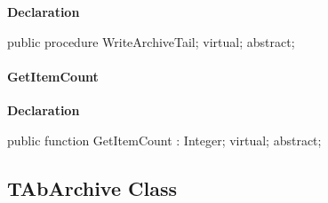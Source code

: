 \documentclass{report}
\newif\ifpdf
\begin{document}
\label{AbArcTyp.TAbArchiveStreamHelper-WriteArchiveTail}
\begin{list}{}{
\setlength{\itemindent}{0cm}
\setlength{\listparindent}{0cm}
\setlength{\leftmargin}{\evensidemargin}
\addtolength{\leftmargin}{\tmplength}
\settowidth{\labelsep}{X}
\addtolength{\leftmargin}{\labelsep}
\setlength{\labelwidth}{\tmplength}
}
\item[\textbf{Declaration}\hfill]
\ifpdf
\begin{flushleft}
\fi
\begin{ttfamily}
public procedure WriteArchiveTail; virtual; abstract;\end{ttfamily}

\ifpdf
\end{flushleft}
\fi

\end{list}
\paragraph*{GetItemCount}\hspace*{\fill}

\label{AbArcTyp.TAbArchiveStreamHelper-GetItemCount}
\begin{list}{}{
\setlength{\itemindent}{0cm}
\setlength{\listparindent}{0cm}
\setlength{\leftmargin}{\evensidemargin}
\addtolength{\leftmargin}{\tmplength}
\settowidth{\labelsep}{X}
\addtolength{\leftmargin}{\labelsep}
\setlength{\labelwidth}{\tmplength}
}
\item[\textbf{Declaration}\hfill]
\ifpdf
\begin{flushleft}
\fi
\begin{ttfamily}
public function GetItemCount : Integer; virtual; abstract;\end{ttfamily}

\ifpdf
\end{flushleft}
\fi

\end{list}
\ifpdf
\subsection*{\large{\textbf{TAbArchive Class}}\normalsize\hspace{1ex}\hrulefill}
\else
\subsection*{TAbArchive Class}
\fi
\label{AbArcTyp.TAbArchive}
\end{document}
